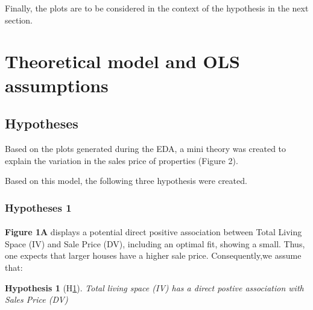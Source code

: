 \documentclass[a4paper]{article}
\newtheorem{hyp}{Hypothesis}
\begin{document}
Finally, the plots are to be considered in the context of the hypothesis in the next section. 



\section{Theoretical model and OLS assumptions}
\subsection{Hypotheses}
Based on the plots generated during the EDA, a mini theory was created to explain the variation in the sales price of properties (Figure 2). 

\begin{center}
\end{center}



Based on this model, the following three hypothesis were created. 
\subsubsection{Hypotheses 1}


\indent \paragraph{} \textbf{Figure 1A} displays a potential direct positive association between Total Living Space (IV) and Sale Price (DV), including an optimal fit, showing a small. Thus, one expects that larger houses have a higher sale price. Consequently,we assume that:

\begin{hyp}[H\ref{hyp:first}] \label{hyp:first}
Total living space (IV) has a direct postive association with Sales Price (DV)
\end{hyp}

\begin{center}
\end{center}
\end{document}
